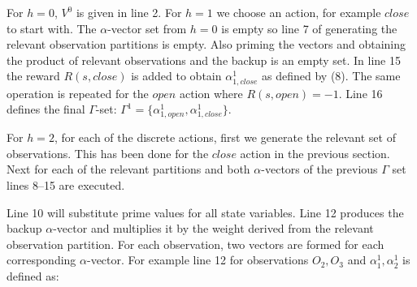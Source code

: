 \documentclass{article}
\begin{document}
For $h=0$, $V^0$ is given in line 2.  For $h=1$ we choose an action, for example $close$ to start with. The $\alpha$-vector set from $h=0$ is empty so line 7 of generating the relevant observation partitions is empty. Also priming the vectors and obtaining the product of relevant observations and the backup is an empty set. In line 15 the reward $R(s,close)$ is added to obtain $\alpha^1_{1,close}$ as defined by (8). The same operation is repeated for the $open$ action where $R(s,open)=-1$. Line 16 defines the final $\Gamma$-set: 
$\Gamma^1 = \{ \alpha^1_{1,open}, \alpha^1_{1,close} \}$.

For $h=2$, for each of the discrete actions, first we generate the relevant set of observations. This has been done for the $close$ action in the previous section. Next for each of the relevant partitions and both $\alpha$-vectors of the previous $\Gamma$ set lines 8--15 are executed. 

Line 10 will substitute prime values for all state variables. Line 12 produces the backup $\alpha$-vector and multiplies it by the weight derived from the relevant observation partition. For each observation, two vectors are formed for each corresponding $\alpha$-vector. For example line 12 for observations $O_2,O_3$ and $\alpha_1^1,\alpha_2^1$ is defined as:
\end{document}
